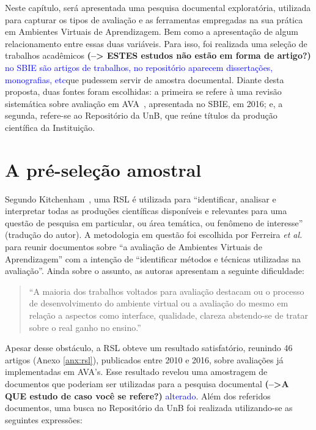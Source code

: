 \label{chap:insp}

Neste capítulo, será apresentada uma pesquisa documental exploratória, utilizada para capturar os tipos de avaliação e as ferramentas empregadas na sua prática em Ambientes Virtuais de Aprendizagem. Bem como a apresentação de algum relacionamento entre essas duas variáveis. Para isso, foi realizada uma seleção de trabalhos acadêmicos \textbf{(--> ESTES estudos não estão em forma de artigo?) } \textcolor{blue} {no SBIE são artigos de trabalhos, no repositório aparecem dissertações, monografias, etc}que pudessem servir de amostra documental. Diante desta proposta, duas fontes foram escolhidas: a primeira se refere à uma revisão sistemática sobre avaliação em AVA~\cite{Ferreira@2016}, apresentada no \acrfull{SBIE}, em 2016; e, a segunda, refere-se ao Repositório da \acrfull{UnB}, que reúne títulos da produção científica da Instituição. 

\section{A pré-seleção amostral}%

Segundo Kitchenham~\cite{kitchenham@2007}, uma \acrfull{RSL} é utilizada para ``identificar, analisar e interpretar todas as produções científicas disponíveis e relevantes para uma questão de pesquisa em particular, ou área temática, ou fenômeno de interesse'' (tradução do autor). A metodologia em questão foi escolhida por Ferreira \emph{et al.}~\cite{Ferreira@2016} para reunir documentos sobre ``a avaliação de Ambientes Virtuais de Aprendizagem'' com a intenção de ``identificar métodos e técnicas utilizadas na avaliação''. Ainda sobre o assunto, as autoras apresentam a seguinte dificuldade:

\begin{quote}
``A maioria dos trabalhos voltados para avaliação destacam ou o processo de desenvolvimento do ambiente virtual ou a avaliação do mesmo em relação a aspectos como interface, qualidade, clareza abstendo-se de tratar sobre o real ganho no ensino.''~\cite{Ferreira@2016}    
\end{quote}

Apesar desse obstáculo, a RSL obteve um resultado satisfatório, reunindo 46 artigos (Anexo \ref{anx:rsl}), publicados entre 2010 e 2016, sobre avaliações já implementadas em AVA's. Esse resultado revelou uma amostragem de documentos que poderiam ser utilizadas para a pesquisa documental \textbf{(-->A QUE estudo de caso você se refere?)} \textcolor{blue} {alterado}. Além dos referidos documentos, uma busca no Repositório da UnB foi realizada utilizando-se as seguintes expressões:

